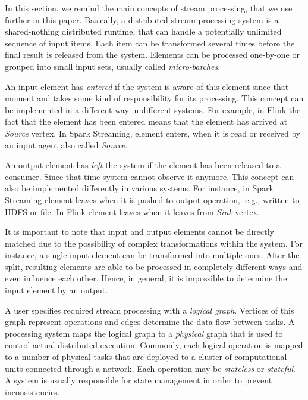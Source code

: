 In this section, we remind the main concepts of stream processing, that we use further in this paper. Basically, a distributed stream processing system is a shared-nothing distributed runtime, that can handle a potentially unlimited sequence of input items. Each item can be transformed several times before the final result is released from the system. Elements can be processed one-by-one or grouped into small input sets, usually called {\em micro-batches}. 

An input element has {\em entered} if the system is aware of this element since that moment and takes some kind of responsibility for its processing. This concept can be implemented in a different way in different systems. For example, in Flink the fact that the element has been entered means that the element has arrived at {\em Source} vertex. In Spark Streaming, element enters, when it is read or received by an input agent also called {\em Source}. 

An output element has {\em left} the system if the element has been released to a consumer. Since that time system cannot observe it anymore. This concept can also be implemented differently in various systems. For instance, in Spark Streaming element leaves when it is pushed to output operation, .e.g., written to HDFS or file. In Flink element leaves when it leaves from {\em Sink} vertex.   

It is important to note that input and output elements cannot be directly matched due to the possibility of complex transformations within the system. For instance, a single input element can be transformed into multiple ones. After the split, resulting elements are able to be processed in completely different ways and even influence each other. Hence, in general, it is impossible to determine the input element by an output.

A user specifies required stream processing with a {\em logical graph}. Vertices of this graph represent operations and edges determine the data flow between tasks. A processing system maps the logical graph to a {\em physical} graph that is used to control actual distributed execution. Commonly, each logical operation is mapped to a number of physical tasks that are deployed to a cluster of computational units connected through a network. Each operation may be {\em stateless} or {\em stateful}. A system is usually responsible for state management in order to prevent inconsistencies.